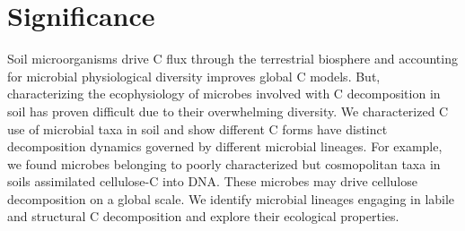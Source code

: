 \section{Significance} Soil microorganisms drive C flux through the terrestrial
biosphere and accounting for microbial physiological diversity improves global
C models. But, characterizing the ecophysiology of microbes involved with
C decomposition in soil has proven difficult due to their overwhelming
diversity. We characterized C use of microbial taxa in soil and show different
C forms have distinct decomposition dynamics governed by different microbial
lineages. For example, we found microbes belonging to poorly characterized but
cosmopolitan taxa in soils assimilated cellulose-C into DNA. These microbes may
drive cellulose decomposition on a global scale. We identify microbial lineages
engaging in labile and structural C decomposition and explore their ecological
properties.
